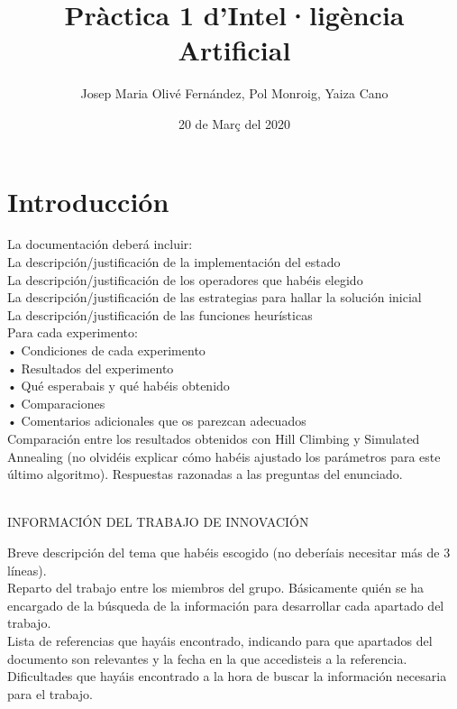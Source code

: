\documentclass[a4paper,10pt]{report}
\title{Pràctica 1 d'Intel·ligència Artificial}
\author{Josep Maria Olivé Fernández,
        Pol Monroig,
        Yaiza Cano}
\date{20 de Març del 2020}
\begin{document}
	\maketitle

	\chapter*{Introducción}

	La documentación deberá incluir: \\
	La descripción/justificación de la implementación del estado \\
	La descripción/justificación de los operadores que habéis elegido \\
	La descripción/justificación de las estrategias para hallar la  solución inicial \\
	La descripción/justificación de las funciones heurísticas\\
	Para cada experimento: \\
	• Condiciones de cada experimento \\
	• Resultados del experimento \\
	• Qué esperabais y qué habéis obtenido \\
	• Comparaciones \\
	• Comentarios adicionales que os parezcan adecuados \\
	Comparación entre los resultados obtenidos con Hill Climbing y Simulated Annealing (no olvidéis explicar cómo habéis ajustado los parámetros para este último algoritmo).
	Respuestas razonadas a las preguntas del enunciado. \\\\

\begin{flushleft}
    INFORMACIÓN DEL TRABAJO DE INNOVACIÓN \\
\end{flushleft}
	Breve descripción del tema que habéis escogido (no deberíais necesitar más de 3 líneas).\\
	Reparto del trabajo entre los miembros del grupo. Básicamente quién se ha encargado de la búsqueda de la información para desarrollar cada apartado del trabajo. \\
	Lista de referencias que hayáis encontrado, indicando para que apartados del documento son relevantes y la fecha en la que accedisteis a la referencia. \\
	Dificultades que hayáis encontrado a la hora de buscar la información necesaria para el trabajo.
\end{document}
